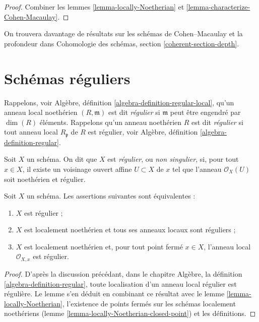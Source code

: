 \begin{proof}
Combiner les lemmes \ref{lemma-locally-Noetherian}
et \ref{lemma-characterize-Cohen-Macaulay}.
\end{proof}

\noindent
On trouvera davantage de résultats sur les schémas de Cohen--Macaulay et la profondeur dans
Cohomologie des schémas, section \ref{coherent-section-depth}.

\section{Schémas réguliers}
\label{section-regular}

\noindent
Rappelons, voir Algèbre, définition \ref{algebra-definition-regular-local},
qu'un anneau local noethérien $(R, \mathfrak m)$ est
dit {\it régulier} si $\mathfrak m$ peut être engendré
par $\dim(R)$ éléments.
Rappelons qu'un anneau noethérien $R$ est dit {\it régulier} si
tout anneau local $R_{\mathfrak p}$ de $R$ est régulier,
voir Algèbre, définition \ref{algebra-definition-regular}.

\begin{definition}
\label{definition-regular}
Soit $X$ un schéma. On dit que $X$ est {\it régulier}, ou {\it non singulier}, si,
pour tout $x \in X$, il existe un voisinage ouvert affine
$U \subset X$ de $x$ tel que l'anneau $\mathcal{O}_X(U)$ soit
noethérien et régulier.
\end{definition}

\begin{lemma}
\label{lemma-characterize-regular}
Soit $X$ un schéma. Les assertions suivantes sont équivalentes :
\begin{enumerate}
\item $X$ est régulier ;
\item $X$ est localement noethérien et tous ses anneaux locaux sont réguliers ;

\item $X$ est localement noethérien et, pour tout point fermé $x \in X$,
l'anneau local $\mathcal{O}_{X, x}$ est régulier.
\end{enumerate}
\end{lemma}

\begin{proof}
D'après la discussion précédant, dans le chapitre Algèbre, la définition
\ref{algebra-definition-regular}, toute localisation
d'un anneau local régulier est régulière. Le lemme s'en déduit
en combinant ce résultat avec le lemme \ref{lemma-locally-Noetherian},
l'existence de points
fermés sur les schémas localement noethériens
(lemme \ref{lemma-locally-Noetherian-closed-point}) et
les définitions.
\end{proof}

